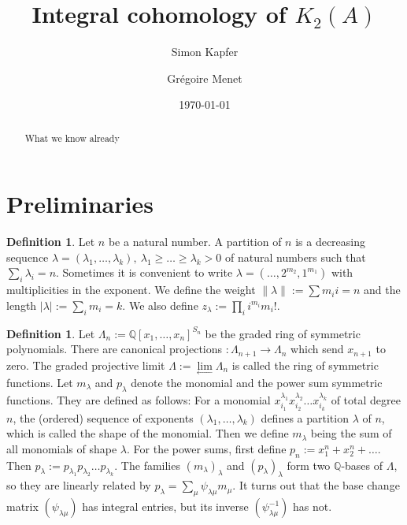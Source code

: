 \documentclass{amsart}
\newcommand{\coloneqq}{:=}
\newcommand{\kum}[2]{K_{ #2 }( #1 )}
\newcommand{\Q}{\mathbb{Q}}
\theoremstyle{plain}
\theoremstyle{definition}
\newtheorem{definition}[theorem]{Definition}
\theoremstyle{remark}
\begin{document}
\title{Integral cohomology of $\kum{A}{2}$}


\author{Simon Kapfer}
\author{Gr\'egoire Menet}
\address{Simon Kapfer, Laboratoire de Math\'ematiques et Applications, UMR CNRS 6086, Universit\'e de Poitiers, T\'el\'eport 2, Boulevard Marie et Pierre Curie, F-86962 Futuroscope Chasseneuil}


\date{\today}


\begin{abstract} 
What we know already
\end{abstract}

\maketitle

\section{Preliminaries}
\begin{definition}
Let $n$ be a natural number. A partition of $n$ is a decreasing sequence $\lambda = (\lambda_1,\ldots,\lambda_k),\ \lambda_1\geq\ldots\geq\lambda_k>0$ of natural numbers such that $\sum_i \lambda_i =n$. Sometimes it is convenient to write $\lambda = (\ldots,2^{m_2},1^{m_1})$ with multiplicities in the exponent.
We define the weight $\|\lambda\| :=\sum m_i i =n$ and the length $|\lambda| := \sum_i m_i =k$. 
We also define $z_\lambda \coloneqq\prod_i i^{m_i} m_i!$. 
\end{definition}
\begin{definition} \label{SymFun}
Let $\Lambda_n := \Q[x_1,\ldots,x_n]^{S_n}$ be the graded ring of symmetric polynomials. There are canonical projections $: \Lambda_{n+1}\rightarrow\Lambda_n$ which send $x_{n+1}$ to zero. The graded projective limit
$\Lambda:=\lim\limits_{\leftarrow}\Lambda_n$ is called the ring of symmetric functions.
Let $m_\lambda$ and $p_\lambda$ denote the monomial and the power sum symmetric functions. They are defined as follows: For a monomial $x_{i_1}^{\lambda_1}x_{i_2}^{\lambda_2}\ldots x_{i_k}^{\lambda_k}$ of total degree $n$, the (ordered) sequence of exponents $(\lambda_1,\ldots,\lambda_k)$ defines a partition $\lambda$ of $n$, which is called the shape of the monomial. Then we define $m_\lambda$ being the sum of all monomials of shape $\lambda$. 
For the power sums, first define $p_n := x_1^n + x_2^n + \ldots$. 
Then $p_\lambda := p_{\lambda_1}p_{\lambda_2}\ldots p_{\lambda_k}$.
The families $(m_\lambda)_\lambda$ and $(p_\lambda)_\lambda$ form two $\Q$-bases of $\Lambda$, so they are linearly related by $p_\lambda = \sum_{\mu} \psi_{\lambda\mu}m_\mu$. It turns out that the base change matrix $(\psi_{\lambda\mu})$ has integral entries, but its inverse $(\psi_{\lambda\mu}^{-1})$ has not.
\end{definition}
\end{document}
